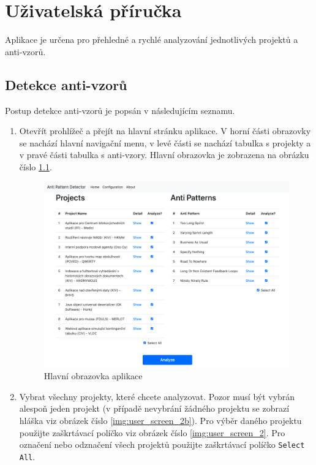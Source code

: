 \documentclass[czech,DP]{thesiskiv}
\begin{document}
\chapter{Uživatelská příručka}
Aplikace je určena pro přehledné a rychlé analyzování jednotlivých projektů a anti-vzorů.
\section{Detekce anti-vzorů}
Postup detekce anti-vzorů je popsán v následujícím seznamu.
\begin{enumerate}
    \item Otevřít prohlížeč a přejít na hlavní stránku aplikace. V horní části obrazovky se nachází hlavní navigační menu, v levé části se nachází tabulka s projekty a v pravé části tabulka s anti-vzory. Hlavní obrazovka je zobrazena na obrázku číslo \ref{img:user_screen_1}.
\begin{figure}[!htb]
    \centering
    \includegraphics[width=350pt]{img/user_screen_1.png}
    \caption{Hlavní obrazovka aplikace}    
    \label{img:user_screen_1}
\end{figure}
\FloatBarrier
    \item Vybrat všechny projekty, které chcete analyzovat. Pozor musí být vybrán alespoň jeden projekt (v případě nevybrání žádného projektu se zobrazí hláška viz obrázek číslo \ref{img:user_screen_2b}). Pro výběr daného projektu použijte zaškrtávací políčko viz obrázek číslo \ref{img:user_screen_2}. Pro označení nebo odznačení všech projektů použijte zaškrtávací políčko \texttt{Select All}.
\begin{figure}[!htb]
    \centering

\end{figure}
\end{enumerate}
\end{document}
